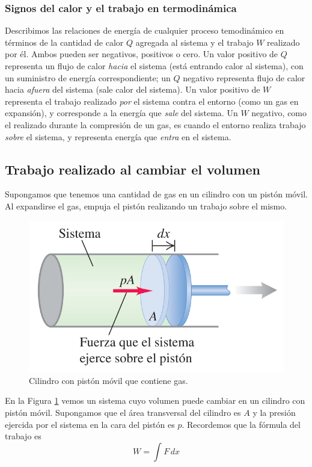 \documentclass[12pt]{article}
\begin{document}
  \subsubsection{Signos del calor y el trabajo en termodinámica}
  Describimos las relaciones de energía de cualquier proceso temodinámico en términos de la cantidad de calor $ Q $ agregada al sistema y el trabajo $ W $ realizado por él. Ambos pueden ser negativos, positivos o cero. Un valor positivo de $ Q $ representa un flujo de calor \textit{hacia} el sistema (está entrando calor al sistema), con un suministro de energía correspondiente; un $ Q $ negativo representa flujo de calor hacia \textit{afuera} del sistema (sale calor del sistema). Un valor positivo de $ W $ representa el trabajo realizado \textit{por} el sistema contra el entorno (como un gas en expansión), y corresponde a la energía que \textit{sale} del sistema. Un $ W $ negativo, como el realizado durante la compresión de un gas, es cuando el entorno realiza trabajo \textit{sobre} el sistema, y representa energía que \textit{entra} en el sistema.

  \subsection{Trabajo realizado al cambiar el volumen}
  Supongamos que tenemos una cantidad de gas en un cilindro con un pistón móvil. Al expandirse el gas, empuja el pistón realizando un trabajo sobre el mismo.

  \begin{figure}[H]
    \centering
    \includegraphics[width=0.5\linewidth]{imagenes/trabajo-gas-piston.png}
    \caption{Cilindro con pistón móvil que contiene gas.}
    \label{fig:gas-piston}
  \end{figure}
  
  En la Figura \ref{fig:gas-piston} vemos un sistema cuyo volumen puede cambiar en un cilindro con pistón móvil. Supongamos que el área transversal del cilindro es $ A $ y la presión ejercida por el sistema en la cara del pistón es $ p $. Recordemos que la fórmula del trabajo es 
  \[
  W = \int_{}^{} F \,dx
  \]
\end{document}

